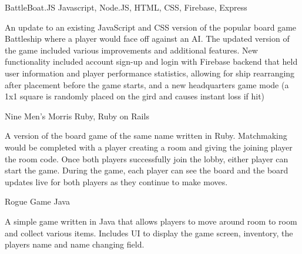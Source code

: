 


\begin{cventries}


\cventry
{BattleBoat.JS} %
{Javascript, Node.JS, HTML, CSS, Firebase, Express} %
{ %
\begin{cvitems}
\item {An update to an existing JavaScript and CSS version of the popular board game Battleship where a player would
face off against an AI. The updated version of the game included various improvements and additional features.
New functionality included account sign-up and login with Firebase backend that held user information and
player performance statistics, allowing for ship rearranging after placement before the game starts, and a new
headquarters game mode (a 1x1 square is randomly placed on the gird and causes instant loss if hit)}
\end{cvitems}
}


\cventry
{Nine Men's Morris} %
{Ruby, Ruby on Rails} %
{ %
\begin{cvitems}
\item {A version of the board game of the same name written in Ruby. Matchmaking would be completed with a player
creating a room and giving the joining player the room code. Once both players successfully join the lobby,
either player can start the game. During the game, each player can see the board and the board updates live for
both players as they continue to make moves.}
\end{cvitems}
}

\cventry
{Rogue Game} %
{Java} %
{ %
\begin{cvitems}
\item {A simple game written in Java that allows players to move around room to room and collect various items. Includes UI to display the game screen, inventory, the players name
and name changing field.}
\end{cvitems}
}


\end{cventries}
